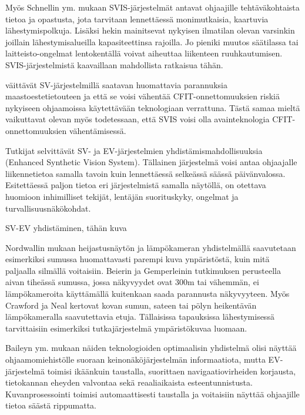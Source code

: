 \documentclass[utf8,bachelor,manualbib]{gradu3}
\begin{document}
Myös Schnellin ym. \citeyearpar{schnellym2004} mukaan SVIS-järjestelmät antavat ohjaajille tehtäväkohtaista tietoa ja opastusta, jota tarvitaan lennettäessä monimutkaisia, kaartuvia lähestymispolkuja. Lisäksi hekin mainitsevat nykyisen ilmatilan olevan varsinkin joillain lähestymisalueilla kapasiteettinsa rajoilla. Jo pieniki muutos säätilassa tai laitteisto-ongelmat lentokentällä voivat aiheuttaa liikenteen ruuhkautumisen. SVIS-järjestelmistä kaavaillaan mahdollista ratkaisua tähän.

\cite{baileyym2007} väittävät SV-järjestelmillä saatavan huomattavia parannuksia maastoestetietouteen ja että se voisi vähentää CFIT-onnettomuuksien riskiä nykyiseen ohjaamoissa käytettävään teknologiaan verrattuna. Tästä samaa mieltä vaikuttavat olevan myös \cite{schnellym2004} todetessaan, että SVIS voisi olla avainteknologia CFIT-onnettomuuksien vähentämisessä.

Tutkijat selvittävät SV- ja EV-järjestelmien yhdistämismahdollisuuksia (Enhanced Synthetic Vision System). Tällainen järjestelmä voisi antaa ohjaajalle liikennetietoa samalla tavoin kuin lennettäessä selkeässä säässä päivänvalossa. Esitettäessä paljon tietoa eri järjestelmistä samalla näytöllä, on otettava huomioon inhimilliset tekijät, lentäjän suorituskyky, ongelmat ja turvallisuusnäkökohdat. \citep{crawfordneal2006}

SV-EV yhdistäminen, tähän kuva \citep{mollersachs1994}

Nordwallin \citeyearpar{nordwall1993} mukaan heijastusnäytön ja lämpökameran yhdistelmällä saavutetaan esimerkiksi sumussa huomattavasti parempi kuva ynpäristöstä, kuin mitä paljaalla silmällä voitaisiin. Beierin ja Gemperleinin \citeyearpar{beiergemperlein2004} tutkimuksen perusteella aivan tiheässä sumussa, jossa näkyvyydet ovat 300m tai vähemmän, ei lämpökameroita käyttämällä kuitenkaan saada parannusta näkyvyyteen. Myös Crawford ja Neal \citeyearpar{crawfordneal2006} kertovat kovan sumun, sateen tai pölyn heikentävän lämpökameralla saavutettavia etuja. Tällaisissa tapauksissa lähestymisessä tarvittaisiin esimerkiksi tutkajärjestelmä ympäristökuvaa luomaan.

Baileyn ym.\citeyearpar{baileyym2007} mukaan näiden teknologioiden optimaalisin yhdistelmä olisi näyttää ohjaamomiehistölle suoraan keinonäköjärjestelmän informaatiota, mutta EV-järjestelmä toimisi ikäänkuin taustalla, suorittaen navigaatiovirheiden korjausta, tietokannan eheyden valvontaa sekä reaaliaikaista esteentunnistusta. Kuvanprosessointi toimisi automaattisesti taustalla ja voitaisiin näyttää ohjaajille tietoa säästä rippumatta.
\end{document}
